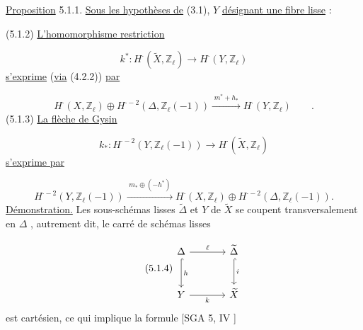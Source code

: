 
\underline{Proposition} 5.1.1. \underline{Sous les hypothèses de} (3.1), $Y$ \underline{désignant une fibre lisse} :

(5.1.2) \quad \underline{L'homomorphisme restriction}

\begin{equation*}
k^* : H^\cdot(\widetilde{X},\mathbb{Z}_\ell) \longrightarrow H^\cdot(Y,\mathbb{Z}_\ell)
\end{equation*}
\underline{s'exprime} (\underline{via} (4.2.2)) \underline{par}

\begin{equation*}
H^\cdot(X,\mathbb{Z}_\ell) \oplus H^{\cdot-2}(\Delta,\mathbb{Z}_\ell(-1)) \xrightarrow{\;m^*+h_*\;} H^\cdot(Y,\mathbb{Z}_\ell) \qquad .
\end{equation*}
(5.1.3) \quad \underline{La flèche de Gysin}

\begin{equation*}
k_* : H^{\cdot-2}(Y,\mathbb{Z}_\ell(-1)) \longrightarrow H^\cdot(\widetilde{X},\mathbb{Z}_\ell)
\end{equation*}
\underline{s'exprime par}

\begin{equation*}
H^{\cdot-2}(Y,\mathbb{Z}_\ell(-1)) \xrightarrow{\;m_* \oplus (-h^*)\;} H^\cdot(X,\mathbb{Z}_\ell) \oplus H^{\cdot-2}(\Delta,\mathbb{Z}_\ell(-1)).
\end{equation*}
\underline{Démonstration.} Les sous-schémas lisses $\widetilde{\Delta}$ et $Y$ de $\widetilde{X}$ se coupent transversalement en $\Delta$ , autrement dit, le carré de schémas lisses

\begin{equation}\tag{5.1.4}
\begin{tikzcd}[column sep=large, row sep=large]
\Delta \arrow[r, "\ell"] \arrow[d, hook, "h"] & \widetilde{\Delta} \arrow[d, hook, "i"] \\
Y \arrow[r, "k"'] & \widetilde{X}
\end{tikzcd}
\end{equation}
est cartésien, ce qui implique la formule [SGA 5, IV \hspace{2.2cm} ]

